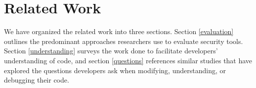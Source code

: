 \documentclass[conference]{IEEEtran}
\begin{document}
%
%


%



\section{Related Work}
\label{sec:rw}

We have organized the related work into three sections. Section \ref{evaluation} outlines the predominant approaches researchers use to evaluate security tools. Section \ref{understanding} surveys the work done to facilitate developers' understanding of code, and section \ref{questions} references similar studies that have explored the questions developers ask when modifying, understanding, or debugging their code.
\end{document}

